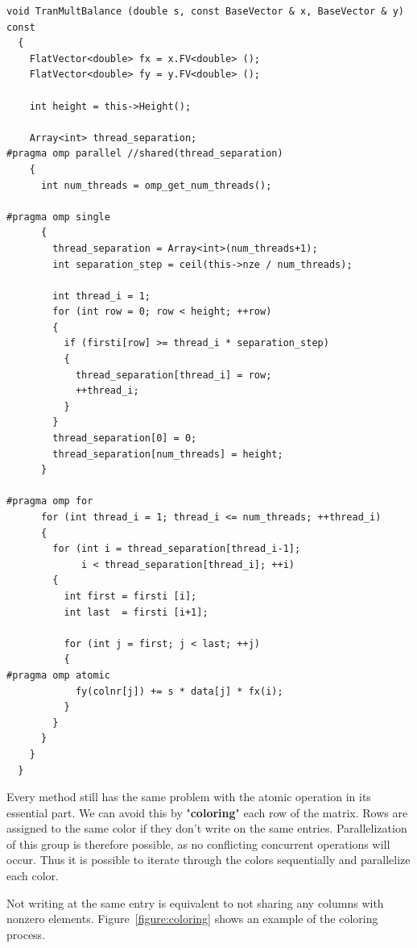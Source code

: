 \documentclass[a4paper,11pt]{scrartcl}
\begin{document}
\begin{lstlisting}
void TranMultBalance (double s, const BaseVector & x, BaseVector & y) const
  {
    FlatVector<double> fx = x.FV<double> ();
    FlatVector<double> fy = y.FV<double> ();

    int height = this->Height();

    Array<int> thread_separation;
#pragma omp parallel //shared(thread_separation)
    {
      int num_threads = omp_get_num_threads();

#pragma omp single
      {
        thread_separation = Array<int>(num_threads+1);
        int separation_step = ceil(this->nze / num_threads);

        int thread_i = 1;
        for (int row = 0; row < height; ++row)
        {
          if (firsti[row] >= thread_i * separation_step)
          {
            thread_separation[thread_i] = row;
            ++thread_i;
          }
        }
        thread_separation[0] = 0;
        thread_separation[num_threads] = height;
      }

#pragma omp for
      for (int thread_i = 1; thread_i <= num_threads; ++thread_i)
      {
        for (int i = thread_separation[thread_i-1];
             i < thread_separation[thread_i]; ++i)
        {
          int first = firsti [i];
          int last  = firsti [i+1];

          for (int j = first; j < last; ++j)
          {
#pragma omp atomic
            fy(colnr[j]) += s * data[j] * fx(i);
          }
        }
      }
    }
  }

\end{lstlisting}

Every method still has the same problem with the atomic operation in its
essential part. We can avoid this by "\textbf{coloring}" each row of the matrix.
Rows are assigned to the same color if they don't write on the same entries.
Parallelization of this group is therefore possible, as no conflicting
concurrent operations will occur. Thus it is possible to iterate through the
colors sequentially and parallelize each color.

Not writing at the same entry is equivalent to not sharing any columns with
nonzero elements. Figure~\ref{figure:coloring} shows an example of the
coloring process.
\end{document}
